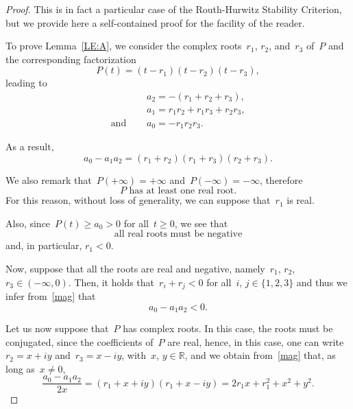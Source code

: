 \documentclass[10pt,a4paper]{amsart}
\newcommand{\R}{\mathbb{R}}
\renewcommand{\ge}{\geqslant}
\begin{document}
\begin{proof}
This is in fact a particular case of the Routh-Hurwitz Stability Criterion, but we provide
here a self-contained proof for the facility of the reader.

To prove Lemma~\ref{LE:A}, we consider the complex roots~$r_1$, $r_2$, and~$r_3$ of~$P$
and the corresponding factorization
$$P(t)=(t-r_1)(t-r_2)(t-r_3),$$
leading to
\begin{equation*}
\begin{split}&
a_2=-(r_1+  r_2 + r_3) ,\\&
a_1=r_1 r_2 + r_1 r_3 + r_2 r_3 , \\ {\mbox{and }}\quad&a_0=-r_1 r_2 r_3 .
\end{split}\end{equation*}

As a result,
\begin{equation}\label{mag}
a_0-a_1a_2=(r_1 + r_2) (r_1 + r_3) (r_2 + r_3).
\end{equation}

We also remark that~$P(+\infty)=+\infty$ and~$P(-\infty)=-\infty$, therefore
\begin{equation}\label{ser.pqkdoewvnb9m87}
{\mbox{$P$ has at least one real root.}}\end{equation} For this reason, without loss of generality, we can suppose that~$r_1$ is real.

Also, since~$P(t)\ge a_0>0$ for all~$t\ge0$, we see that
\begin{equation}\label{ser}
{\mbox{all real roots must be negative}}\end{equation} and, in particular, $r_1<0$.

Now, suppose that all the roots are real and negative,
namely~$r_1$, $r_2$, $r_3\in(-\infty,0)$.
Then, it holds that~$r_i+r_j<0$ for all~$i$, $j\in\{1,2,3\}$ and thus
we infer from~\eqref{mag} that
\begin{equation}\label{Swq90nc79m0bv37}
a_0-a_1a_2<0.\end{equation}

Let us now suppose that~$P$ has complex roots.
In this case, the roots must be conjugated, since the coefficients of~$P$ are real,
hence, in this case, one can write~$r_2=x+iy$ and~$r_3=x-iy$, with~$x$, $y\in\R$,
and we obtain from~\eqref{mag} that, as long as~$x\ne0$,
\begin{equation}\label{ser2} \frac{a_0-a_1a_2}{2x}=(r_1 + x+iy) (r_1 + x-iy)=
2 r_1 x + r_1^2 + x^2 + y^2.\end{equation}


\end{proof}
\end{document}
